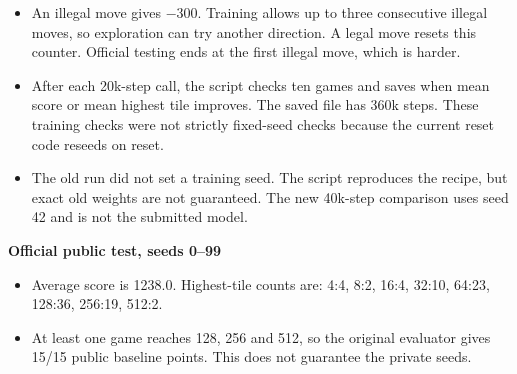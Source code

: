 \documentclass[a4paper]{article}
\begin{document}
\begin{answer}
\[\]
\begin{itemize}
\item An illegal move gives $-300$. Training allows up to three consecutive illegal moves, so exploration can try another direction. A legal move resets this counter. Official testing ends at the first illegal move, which is harder.
\item After each 20k-step call, the script checks ten games and saves when mean score or mean highest tile improves. The saved file has 360k steps. These training checks were not strictly fixed-seed checks because the current reset code reseeds on reset.
\item The old run did not set a training seed. The script reproduces the recipe, but exact old weights are not guaranteed. The new 40k-step comparison uses seed 42 and is not the submitted model.
\end{itemize}
\textbf{Official public test, seeds 0--99}
\begin{itemize}
\item Average score is 1238.0. Highest-tile counts are: 4:4, 8:2, 16:4, 32:10, 64:23, 128:36, 256:19, 512:2.
\item At least one game reaches 128, 256 and 512, so the original evaluator gives 15/15 public baseline points. This does not guarantee the private seeds.
\end{itemize}
\end{answer}
\newpage
\end{document}
